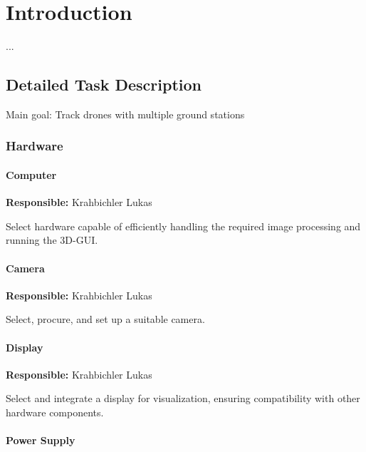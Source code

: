 \chapter{Introduction}

...

\section{Detailed Task Description}

Main goal: Track drones with multiple ground stations

\subsection{Hardware}

\subsubsection{Computer}

\textbf{Responsible:} Krahbichler Lukas

Select hardware capable of efficiently handling the required image processing and running the 3D-GUI.

\subsubsection{Camera} %

\textbf{Responsible:} Krahbichler Lukas

Select, procure, and set up a suitable camera.

\subsubsection{Display} %

\textbf{Responsible:} Krahbichler Lukas

Select and integrate a display for visualization, ensuring compatibility with other hardware components.

\subsubsection{Power Supply}

